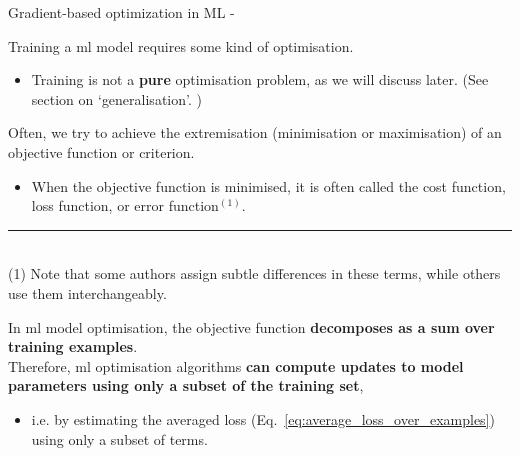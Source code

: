 

\begin{frame}[t,allowframebreaks]{
    Gradient-based optimization in ML -}

    Training a \gls{ml} model requires 
    some kind of \gls{optimisation}.
    \begin{itemize}
        \item Training is not a {\bf pure} \gls{optimisation} problem, 
        as we will discuss later. (See section on `\Gls{generalisation}'. 
        \hyperlink{sec:Generalisation}{})
    \end{itemize}
    \vspace{0.2cm}

    Often, we try to achieve the \gls{extremisation} 
    (minimisation or maximisation) of an 
    \gls{objective function} or 
    \gls{criterion}.
    \begin{itemize}
        \item 
            When the \gls{objective function} is minimised, 
            it is often called the
            \gls{cost function},
            \gls{loss function}, or
            \gls{error function}$^{(1)}$.
    \end{itemize}
    \vspace{0.2cm}

    \vspace{0.1cm}
    \noindent\rule{4cm}{0.4pt}\\
    {\tiny
    (1) Note that some authors assign subtle differences in these terms,
    while others use them interchangeably.\\
    }

    \framebreak


    In \gls{ml} model  
    \gls{optimisation},
    the \gls{objective function}
    {\bf decomposes as a sum over training examples}.\\
    \vspace{0.2cm}
    Therefore, \gls{ml} \gls{optimisation} algorithms {\bf can compute updates
    to model parameters using only a subset of the
    \gls{training set}}, \\
    \begin{itemize}
        \small
        \item i.e. by estimating the averaged \gls{loss} 
        (Eq.~\ref{eq:average_loss_over_examples}) using only
        a subset of terms.
    \end{itemize}
    \vspace{0.2cm}


\end{frame}
